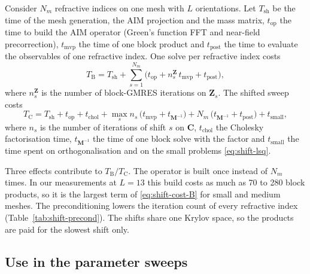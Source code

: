 \documentclass[11pt,a4paper]{article}
\begin{document}
Consider $N_m$ refractive indices on one mesh with $L$ orientations.
Let $T_{\text{sh}}$ be the time of the mesh generation, the AIM
projection and the mass matrix, $t_{\text{op}}$ the time to build the
AIM operator (Green's function FFT and near-field precorrection),
$t_{\text{mvp}}$ the time of one block product and $t_{\text{post}}$
the time to evaluate the observables of one refractive index.
One solve per refractive index costs
\begin{equation}
  T_{\text{B}}
    = T_{\text{sh}}
      + \sum_{s=1}^{N_m}
        \bigl(t_{\text{op}} + n_s^{\mathbf{Z}}\,t_{\text{mvp}}
              + t_{\text{post}}\bigr),
  \label{eq:shift-cost-B}
\end{equation}
where $n_s^{\mathbf{Z}}$ is the number of block-GMRES iterations on
$\mathbf{Z}_s$.
The shifted sweep costs
\begin{equation}
  T_{\text{C}}
    = T_{\text{sh}} + t_{\text{op}} + t_{\text{chol}}
      + \max_s n_s\,\bigl(t_{\text{mvp}} + t_{\mathbf{M}^{-1}}\bigr)
      + N_m\,\bigl(t_{\mathbf{M}^{-1}} + t_{\text{post}}\bigr)
      + t_{\text{small}},
  \label{eq:shift-cost-C}
\end{equation}
where $n_s$ is the number of iterations of shift $s$ on
$\mathbf{C}$, $t_{\text{chol}}$ the Cholesky factorisation time,
$t_{\mathbf{M}^{-1}}$ the time of one block solve with the factor and
$t_{\text{small}}$ the time spent on orthogonalisation and on the
small problems \eqref{eq:shift-lsq}.

Three effects contribute to $T_{\text{B}}/T_{\text{C}}$.
The operator is built once instead of $N_m$ times.
In our measurements at $L = 13$ this build costs as much as 70 to 280
block products, so
it is the largest term of \eqref{eq:shift-cost-B} for small and
medium meshes.
The preconditioning lowers the iteration count of every refractive
index (Table~\ref{tab:shift-precond}).
The shifts share one Krylov space, so the products are paid for the
slowest shift only.

\subsection{Use in the parameter sweeps}
\label{sec:shift-sweeps}
\end{document}
